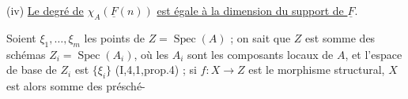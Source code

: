 (iv) \uline{Le degré de} $\chi_A(\underline F(n))$ \uline{est égale à la dimension du support de $\underline F$}.

Soient  $\xi_1,\ldots,\xi_m$ les points de $Z=\operatorname{Spec}(A)$ ; on sait que  $Z$ est somme des schémas $Z_i=\operatorname{Spec}(A_i)$,  où  les $A_i$ sont les composants locaux de $A$, et l'espace de base de $Z_i$ est $\{\xi_i\}$ (I,4,1,prop.4) ; si $f:X\to Z$ est le morphisme structural, $X$ est alors somme des présché-

